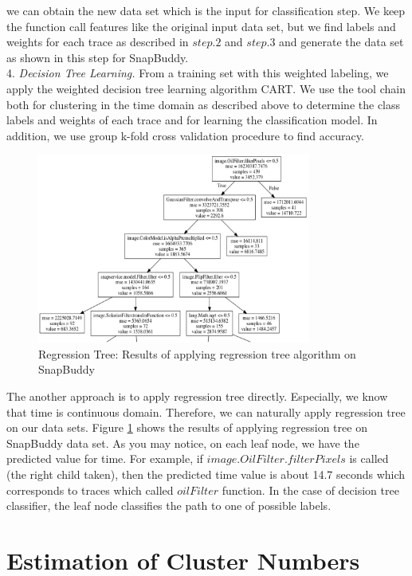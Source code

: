 \documentclass{article}
\begin{document}
we can obtain the new data set which is the input for classification step. 
We keep the function call features like the original input data set, but we
find labels and weights for each trace as described in $step.2$ and $step.3$
and generate the data set as shown in this step for SnapBuddy. \\
4. \smallskip\textit{Decision Tree Learning.}
From a training set with this weighted labeling, we apply the weighted
decision tree learning algorithm CART.
We use the tool chain both for clustering in the time domain as described
above to determine the class labels and weights of each trace and for
learning the classification model. In addition, we use group k-fold cross
validation procedure to find accuracy. 
\begin{figure}[t]
    \centering
    \includegraphics[width=0.8\textwidth]{Regression_Tree}
    \caption{Regression Tree: Results of applying regression tree algorithm on SnapBuddy}
    \label{Regression_Tree}
\end{figure}

The another approach is to apply regression tree directly. Especially,
we know that time is continuous domain. Therefore, we can naturally
apply regression tree on our data sets. Figure \ref{Regression_Tree}
shows the results of applying regression tree on SnapBuddy data set.
As you may notice, on each leaf node, we have the predicted value for
time. For example, if $image.OilFilter.filterPixels$ is called (the right child taken), 
then the predicted time value is about 14.7 seconds which corresponds to
traces which called $oilFilter$ function. In the case of decision tree classifier,
the leaf node classifies the path to one of possible labels. 



\section{Estimation of Cluster Numbers}
\end{document}

